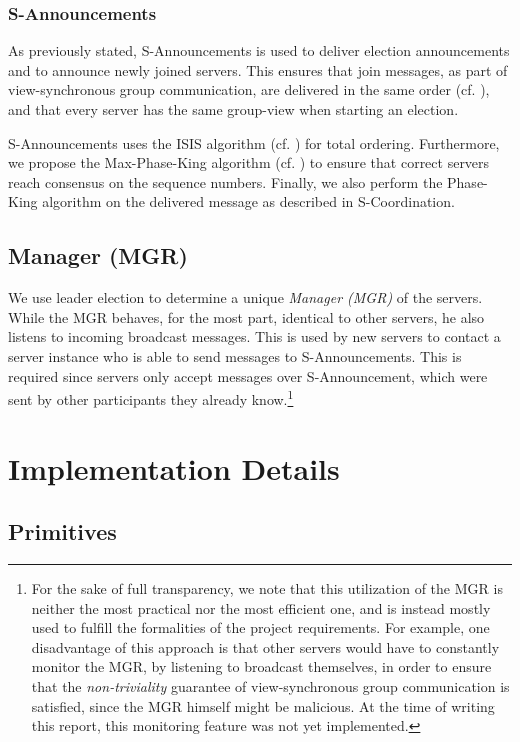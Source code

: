\documentclass[runningheads]{llncs}
\begin{document}
\subsubsection{S-Announcements}
As previously stated, \textsf{S-Announcements} is used to deliver election announcements and to announce newly joined servers. This ensures that join messages, as part of view-synchronous group communication, are delivered in the same order (cf. ), and that every server has the same group-view when starting an election. 

\textsf{S-Announcements} uses the ISIS algorithm (cf. ) for total ordering. Furthermore, we propose the Max-Phase-King algorithm (cf. ) to ensure that correct servers reach consensus on the sequence numbers. Finally, we also perform the Phase-King algorithm on the delivered message as described in \textsf{S-Coordination}.

\subsection{Manager (MGR)}
We use leader election to determine a unique \textit{Manager (MGR)} of the servers. While the MGR behaves, for the most part, identical to other servers, he also listens to incoming broadcast messages. This is used by new servers to contact a server instance who is able to send messages to \textsf{S-Announcements}. This is required since servers only accept messages over \textsf{S-Announcement}, which were sent by other participants they already know.\footnote{For the sake of full transparency, we note that this utilization of the MGR is neither the most practical nor the most efficient one, and is instead mostly used to fulfill the formalities of the project requirements. For example, one disadvantage of this approach is that other servers would have to constantly monitor the MGR, by listening to broadcast themselves, in order to ensure that the \textit{non-triviality} guarantee of view-synchronous group communication is satisfied, since the MGR himself might be malicious. At the time of writing this report, this monitoring feature was not yet implemented.\label{footnote:mgr}}

\newpage
\section{Implementation Details}\label{sec:implementation}

\subsection{Primitives} \label{sec:primitives}
\end{document}
